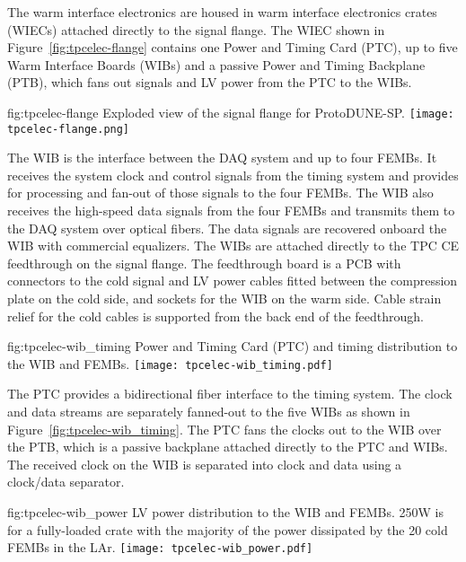 The warm interface electronics are housed in warm interface electronics crates (WIECs)
attached directly to the signal flange.  The WIEC shown in Figure~\ref{fig:tpcelec-flange} 
contains one
Power and Timing Card (PTC), up to five Warm Interface Boards (WIBs) and a passive
Power and Timing Backplane (PTB), which fans out signals and LV power from the PTC to the WIBs.

\begin{dunefigure}
{fig:tpcelec-flange}
{Exploded view of the signal flange for ProtoDUNE-SP.}
\texttt{[image: tpcelec-flange.png]}
\end{dunefigure}

The WIB is the interface between the
DAQ system and up to four
FEMBs. It receives the system clock and control signals from the
timing system and provides for processing and fan-out of those signals to the four
FEMBs. The WIB also receives the high-speed data signals from the four 
FEMBs and transmits them to the DAQ system over optical
fibers. The data signals are recovered onboard the WIB with commercial equalizers. The WIBs are attached directly to the TPC
CE feedthrough on the signal flange. The feedthrough
board is a PCB with connectors to the cold signal and LV power cables fitted
between the compression plate on the cold side, and sockets for
the WIB on the warm side. Cable strain relief for the cold cables is 
supported from the back end of the feedthrough.

\begin{dunefigure}
{fig:tpcelec-wib_timing}
{Power and Timing Card (PTC) and timing distribution to the WIB and FEMBs.}
\texttt{[image: tpcelec-wib\_timing.pdf]}
\end{dunefigure}

The PTC provides a bidirectional fiber interface to the
timing system.  The clock and data
streams are separately fanned-out to the five WIBs as shown in
Figure~\ref{fig:tpcelec-wib_timing}. The PTC fans the clocks out to the WIB over the
PTB, which is a passive backplane attached directly to the PTC and
WIBs.  The received clock on the WIB is separated into clock and
data using a clock/data separator.

\begin{dunefigure}
{fig:tpcelec-wib_power}
{LV power distribution to the WIB and FEMBs. 250W is for a fully-loaded crate with the majority of the power dissipated by the 20 cold FEMBs in the LAr.}
\texttt{[image: tpcelec-wib\_power.pdf]}
\end{dunefigure}

